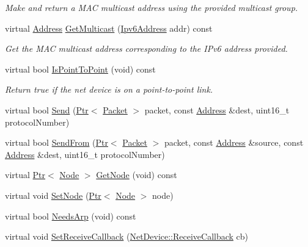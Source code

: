 \begin{DoxyCompactItemize}
\begin{DoxyCompactList}\small\item\em Make and return a M\+AC multicast address using the provided multicast group. \end{DoxyCompactList}\item 
virtual \hyperlink{classns3_1_1Address}{Address} \hyperlink{classns3_1_1VirtualNetDevice_aa35482ffe0c1a6e0a13adf1ab2f7999e}{Get\+Multicast} (\hyperlink{classns3_1_1Ipv6Address}{Ipv6\+Address} addr) const 
\begin{DoxyCompactList}\small\item\em Get the M\+AC multicast address corresponding to the I\+Pv6 address provided. \end{DoxyCompactList}\item 
virtual bool \hyperlink{classns3_1_1VirtualNetDevice_a85359c4e68e987d037ba8e28b7ad206b}{Is\+Point\+To\+Point} (void) const 
\begin{DoxyCompactList}\small\item\em Return true if the net device is on a point-\/to-\/point link. \end{DoxyCompactList}\item 
virtual bool \hyperlink{classns3_1_1VirtualNetDevice_acfd15730e0e77206f8c6ebcf1479eaf9}{Send} (\hyperlink{classns3_1_1Ptr}{Ptr}$<$ \hyperlink{classns3_1_1Packet}{Packet} $>$ packet, const \hyperlink{classns3_1_1Address}{Address} \&dest, uint16\+\_\+t protocol\+Number)
\item 
virtual bool \hyperlink{classns3_1_1VirtualNetDevice_a7d6da9fb890983644bd02bbc792709d2}{Send\+From} (\hyperlink{classns3_1_1Ptr}{Ptr}$<$ \hyperlink{classns3_1_1Packet}{Packet} $>$ packet, const \hyperlink{classns3_1_1Address}{Address} \&source, const \hyperlink{classns3_1_1Address}{Address} \&dest, uint16\+\_\+t protocol\+Number)
\item 
virtual \hyperlink{classns3_1_1Ptr}{Ptr}$<$ \hyperlink{classns3_1_1Node}{Node} $>$ \hyperlink{classns3_1_1VirtualNetDevice_a78707c2e2cb0a5b3620f42caa7fe7811}{Get\+Node} (void) const 
\item 
virtual void \hyperlink{classns3_1_1VirtualNetDevice_ae8a84665899b549ae465d715efd2fd43}{Set\+Node} (\hyperlink{classns3_1_1Ptr}{Ptr}$<$ \hyperlink{classns3_1_1Node}{Node} $>$ node)
\item 
virtual bool \hyperlink{classns3_1_1VirtualNetDevice_aee0cd69025468398482b7af188fcc34f}{Needs\+Arp} (void) const 
\item 
virtual void \hyperlink{classns3_1_1VirtualNetDevice_ace48567f181d0f096cd76a45e7ec22c8}{Set\+Receive\+Callback} (\hyperlink{classns3_1_1NetDevice_ad5e5e1ca187472bc2ba99575d8def568}{Net\+Device\+::\+Receive\+Callback} cb)

\end{DoxyCompactItemize}
